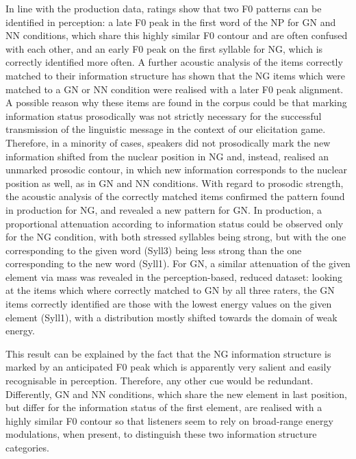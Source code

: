 In line with the production data, ratings show that two F0 patterns can be identified in perception: a late F0 peak in the first word of the NP for GN and NN conditions, which share this highly similar F0 contour and are often confused with each other, and an early F0 peak on the first syllable for NG, which is correctly identified more often. A further acoustic analysis of the items correctly matched to their information structure has shown that the NG items which were matched to a GN or NN condition were realised with a later F0 peak alignment. A possible reason why these items are found in the corpus could be that marking information status prosodically was not strictly necessary for the successful transmission of the linguistic message in the context of our elicitation game. Therefore, in a minority of cases, speakers did not prosodically mark the new information shifted from the nuclear position in NG and, instead, realised an unmarked prosodic contour, in which new information corresponds to the nuclear position as well, as in GN and NN conditions. With regard to prosodic strength, the acoustic analysis of the correctly matched items confirmed the pattern found in production for NG, and revealed a new pattern for GN. In production, a proportional attenuation according to information status could be observed only for the NG condition, with both stressed syllables being strong, but with the one corresponding to the given word (Syll3) being less strong than the one corresponding to the new word (Syll1). For GN, a similar attenuation of the given element via mass was revealed in the perception-based, reduced dataset: looking at the items which where correctly matched to GN by all three raters, the GN items correctly identified are those with the lowest energy values on the given element (Syll1), with a distribution mostly shifted towards the domain of weak energy.

This result can be explained by the fact that the NG information structure is marked by an anticipated F0 peak which is apparently very salient and easily recognisable in perception. Therefore, any other cue would be redundant. Differently, GN and NN conditions, which share the new element in last position, but differ for the information status of the first element, are realised with a highly similar F0 contour so that listeners seem to rely on broad-range energy modulations, when present, to distinguish these two information structure categories.

